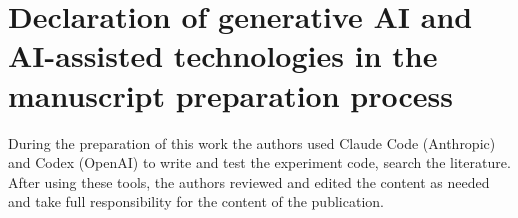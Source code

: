 \documentclass[preprint,12pt,authoryear]{elsarticle}
\begin{document}
\section*{Declaration of generative AI and AI-assisted technologies in the manuscript preparation process}
During the preparation of this work the authors used Claude Code (Anthropic) and Codex (OpenAI) to write and test
the experiment code, search the literature. After using these tools, the
authors reviewed and edited the content as needed and take full responsibility for the content of the publication.



\end{document}
